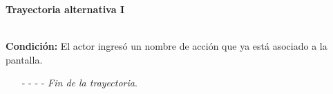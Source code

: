 \hypertarget{CU11-1-1-1:TAI}{\textbf{Trayectoria alternativa I}}\\
\noindent \textbf{Condición:} El actor ingresó un nombre de acción que ya está asociado a la pantalla.
\begin{enumerate}
	\UCpaso[\UCsist] Muestra el mensaje  señalando el campo que presenta la duplicidad en la pantalla .
	\UCpaso Regresa al paso \ref{CU11.1.1-P3} de la trayectoria principal.
	\item[- -] - - {\em {Fin de la trayectoria}}.
\end{enumerate}